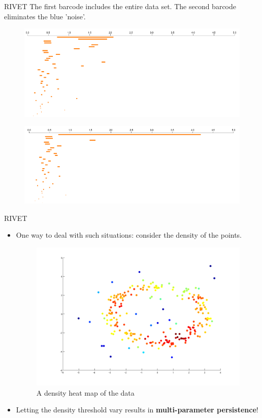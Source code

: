 \begin{frame}{RIVET}
The first barcode includes the entire data set.  The second barcode eliminates the blue 'noise'.

\begin{figure}
\centering
\includegraphics[scale=0.35]{images/data7.png}
\end{figure} 

\begin{figure}
\centering
\includegraphics[scale=0.35]{images/data7nonoise.png}
\end{figure} 
\end{frame}
\begin{frame}{RIVET}
\begin{itemize}
\item<1-> One way to deal with such situations: consider the density of the points.
\begin{figure}
\includegraphics[scale=0.2]{images/data7density}
\caption{A density heat map of the data}
\end{figure} 
\item<2-> Letting the density threshold vary results in \textbf{multi-parameter persistence}!
\end{itemize}
\end{frame}
